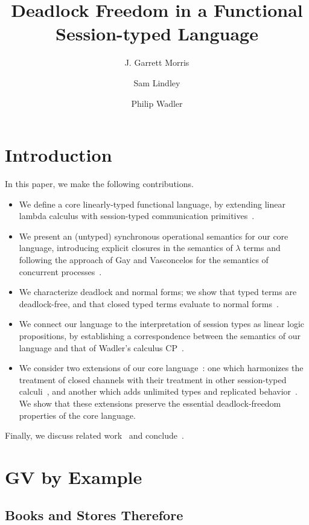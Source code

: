 \documentclass[orivec,envcountsame]{llncs}
\title{Deadlock Freedom in a Functional Session-typed Language}
\author{J. Garrett Morris \and Sam Lindley \and Philip Wadler}
\institute{The University of Edinburgh \\
           \email{\{Garrett.Morris,Sam.Lindley,Philip.Wadler\}@ed.ac.uk} \vspace{-5mm}}
\begin{document}
\maketitle

\begin{abstract}
\end{abstract}

\section{Introduction}\label{sec:intro}

In this paper, we make the following contributions.
\begin{itemize}
\item We define a core linearly-typed functional language, by extending linear lambda calculus
  with session-typed communication primitives~.
\item We present an (untyped) synchronous operational semantics for our core language, introducing
  explicit closures in the semantics of $\lambda$ terms and following the approach of Gay and
  Vasconcelos for the semantics of concurrent processes~.
\item We characterize deadlock and normal forms; we show that typed terms are deadlock-free, and
  that closed typed terms evaluate to normal forms~.
\item We connect our language to the interpretation of session types as linear logic propositions,
  by establishing a correspondence between the semantics of our language and that of Wadler's
  calculus CP~.
\item We consider two extensions of our core language~: one which harmonizes the
  treatment of closed channels with their treatment in other session-typed calculi~,
  and another which adds unlimited types and replicated behavior~.  We show that
  these extensions preserve the essential deadlock-freedom properties of the core language.
\end{itemize}
Finally, we discuss related work~ and conclude~.

\section{GV by Example}\label{sec:examples}

\subsection{Books and Stores Therefore}
\end{document}
